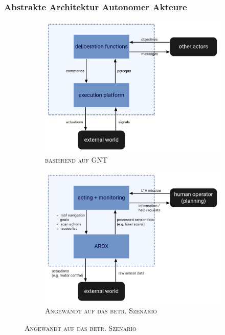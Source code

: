 \documentclass{beamer}
\begin{document}
\begin{frame}
  \frametitle{Abstrakte Architektur Autonomer Akteure}
  \begin{figure}[H]
    \centering
    \begin{subfigure}[b]{0.49\textwidth}
        \centering
        \includegraphics[width=\textwidth]{img/GNT_actor_new.png}
        \caption*{\textsc{ basierend auf GNT \cite{GNT:2016}}}
    \end{subfigure}
    \hfill
    \begin{subfigure}[b]{0.49\textwidth}
        \centering
        \includegraphics[width=\textwidth]{img/MSC_actor_new.png}
        \caption*{\textsc{Angewandt auf das betr. Szenario}}
    \end{subfigure}
  \end{figure}
\end{frame}
\end{document}
